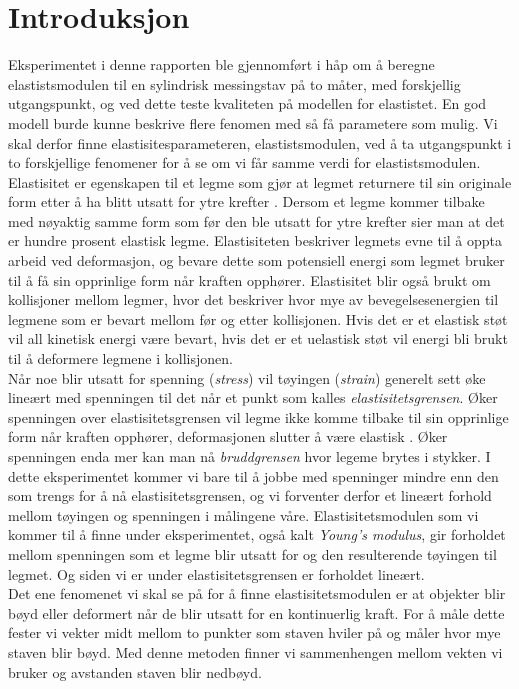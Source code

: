 \documentclass[%
 reprint,
 amsmath,amssymb,
 aps,
 norsk,
 booktabs
]{revtex4-1}
\begin{document}
\section{Introduksjon}
Eksperimentet i denne rapporten ble gjennomført i håp om å beregne elastistsmodulen til en sylindrisk messingstav på to måter, med forskjellig utgangspunkt, og ved dette teste kvaliteten på modellen for elastistet. En god modell burde kunne beskrive flere fenomen med så få parametere som mulig. Vi skal derfor finne elastisitesparameteren, elastistsmodulen, ved å ta utgangspunkt i to forskjellige fenomener for å se om vi får samme verdi for elastistsmodulen.\\
 Elastisitet er egenskapen til et legme som gjør at legmet returnere til sin originale form etter å ha blitt utsatt  for ytre krefter \cite{gronn}. Dersom et legme kommer tilbake med nøyaktig samme form som før den ble utsatt for ytre krefter sier man at det er hundre prosent elastisk legme. Elastisiteten beskriver legmets evne til å oppta arbeid ved deformasjon, og bevare dette som potensiell energi som legmet bruker til å få sin opprinlige form når kraften opphører. Elastisitet blir også brukt om kollisjoner mellom legmer, hvor det beskriver hvor mye av bevegelsesenergien til legmene som er bevart mellom før og etter kollisjonen. Hvis det er et elastisk støt vil all kinetisk energi være bevart, hvis det er et uelastisk støt vil energi bli brukt til å deformere legmene i kollisjonen.\\
Når noe blir utsatt for spenning (\textit{stress}) vil tøyingen (\textit{strain}) generelt sett øke lineært med spenningen til det når et punkt som kalles \textit{elastisitetsgrensen}. Øker spenningen over elastisitetsgrensen vil legme ikke komme tilbake til sin opprinlige form når kraften opphører, deformasjonen slutter å være elastisk  \cite{gronn}. Øker spenningen enda mer kan man nå \textit{bruddgrensen} hvor legeme brytes i stykker. I dette eksperimentet kommer vi bare til å jobbe med spenninger mindre enn den som trengs for å nå elastisitetsgrensen, og vi forventer derfor et lineært forhold mellom tøyingen og spenningen i målingene våre. Elastisitetsmodulen som vi kommer til å finne under eksperimentet, også kalt \textit{Young's modulus}, gir forholdet mellom spenningen som et legme blir utsatt for og den resulterende tøyingen til legmet. Og siden vi er under elastisitetsgrensen er forholdet lineært.\\
Det ene fenomenet vi skal se på for å finne elastisitetsmodulen er at objekter blir bøyd eller deformert når de blir utsatt for en kontinuerlig kraft. For å måle dette fester vi vekter midt mellom to punkter som staven hviler på og måler hvor mye staven blir bøyd. Med denne metoden finner vi sammenhengen mellom vekten vi bruker og avstanden staven blir nedbøyd.\\
\end{document}

